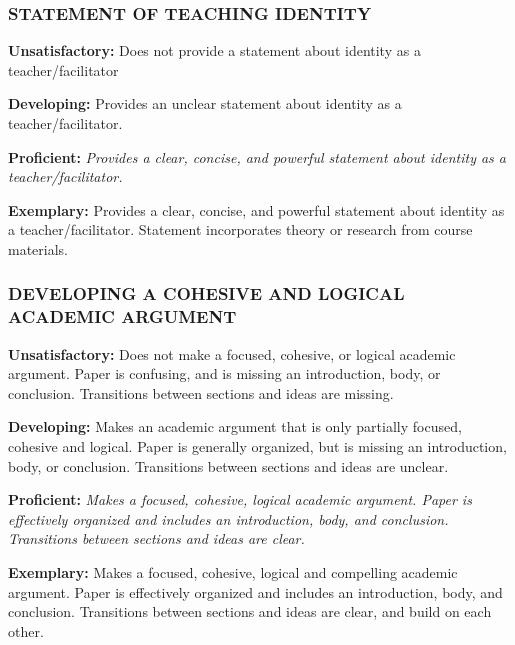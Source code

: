\documentclass[
]{book}
\begin{document}
\hypertarget{statement-of-teaching-identity}{%
\subsubsection*{STATEMENT OF TEACHING IDENTITY}\label{statement-of-teaching-identity}}

\textbf{Unsatisfactory:} Does not provide a statement about identity as a teacher/facilitator

\textbf{Developing:} Provides an unclear statement about identity as a teacher/facilitator.

\textbf{Proficient:} \emph{Provides a clear, concise, and powerful statement about identity as a teacher/facilitator.}

\textbf{Exemplary:} Provides a clear, concise, and powerful statement about identity as a teacher/facilitator. Statement incorporates theory or research from course materials.

\hypertarget{developing-a-cohesive-and-logical-academic-argument}{%
\subsubsection*{DEVELOPING A COHESIVE AND LOGICAL ACADEMIC ARGUMENT}\label{developing-a-cohesive-and-logical-academic-argument}}

\textbf{Unsatisfactory:} Does not make a focused, cohesive, or logical academic argument. Paper is confusing, and is missing an introduction, body, or conclusion. Transitions between sections and ideas are missing.

\textbf{Developing:} Makes an academic argument that is only partially focused, cohesive and logical. Paper is generally organized, but is missing an introduction, body, or conclusion. Transitions between sections and ideas are unclear.

\textbf{Proficient:} \emph{Makes a focused, cohesive, logical academic argument. Paper is effectively organized and includes an introduction, body, and conclusion. Transitions between sections and ideas are clear.}

\textbf{Exemplary:} Makes a focused, cohesive, logical and compelling academic argument. Paper is effectively organized and includes an introduction, body, and conclusion. Transitions between sections and ideas are clear, and build on each other.
\end{document}
